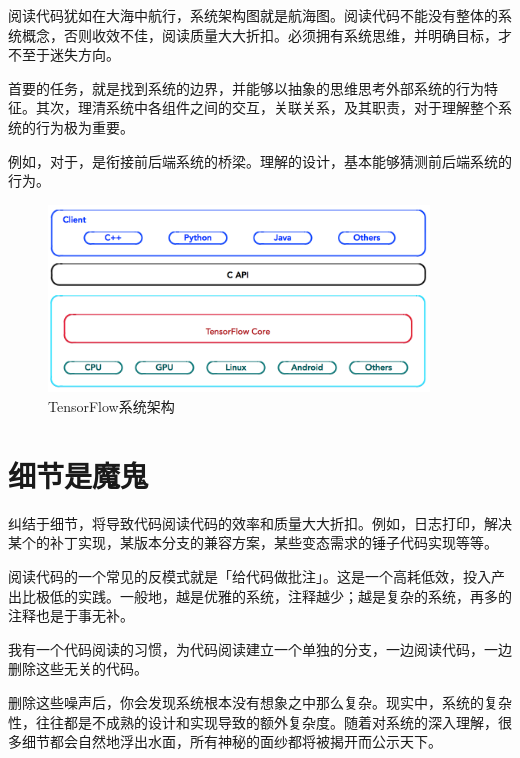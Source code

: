\begin{content}

阅读代码犹如在大海中航行，系统架构图就是航海图。阅读代码不能没有整体的系统概念，否则收效不佳，阅读质量大大折扣。必须拥有系统思维，并明确目标，才不至于迷失方向。

首要的任务，就是找到系统的边界，并能够以抽象的思维思考外部系统的行为特征。其次，理清系统中各组件之间的交互，关联关系，及其职责，对于理解整个系统的行为极为重要。

例如，对于，是衔接前后端系统的桥梁。理解的设计，基本能够猜测前后端系统的行为。

\begin{figure}[!h]
\centering
\includegraphics[width=0.9\textwidth]{figures/tf-architecture-simple.png}
\caption{TensorFlow系统架构}
 \label{fig:tf-architecture-simple}
\end{figure}

\end{content}

\section{细节是魔鬼}

\begin{content}

纠结于细节，将导致代码阅读代码的效率和质量大大折扣。例如，日志打印，解决某个的补丁实现，某版本分支的兼容方案，某些变态需求的锤子代码实现等等。

阅读代码的一个常见的反模式就是「给代码做批注」。这是一个高耗低效，投入产出比极低的实践。一般地，越是优雅的系统，注释越少；越是复杂的系统，再多的注释也是于事无补。

我有一个代码阅读的习惯，为代码阅读建立一个单独的分支，一边阅读代码，一边删除这些无关的代码。

\begin{leftbar}
\end{leftbar}

删除这些噪声后，你会发现系统根本没有想象之中那么复杂。现实中，系统的复杂性，往往都是不成熟的设计和实现导致的额外复杂度。随着对系统的深入理解，很多细节都会自然地浮出水面，所有神秘的面纱都将被揭开而公示天下。

\end{content}

